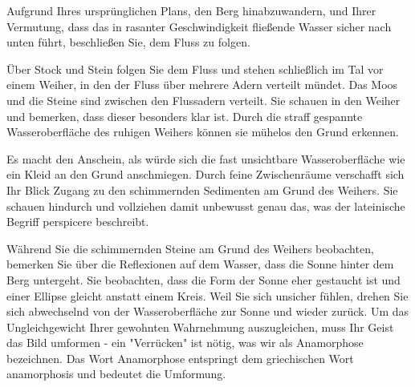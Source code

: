 Aufgrund Ihres ursprünglichen Plans, den Berg hinabzuwandern, und Ihrer Vermutung, dass das in rasanter Geschwindigkeit fließende Wasser sicher nach unten führt, beschließen Sie, dem Fluss zu folgen.

Über Stock und Stein folgen Sie dem Fluss und stehen schließlich im Tal vor einem Weiher, in den der Fluss über mehrere Adern verteilt mündet. Das Moos und die Steine sind zwischen den Flussadern verteilt. Sie schauen in den Weiher und bemerken, dass dieser besonders klar ist. Durch die straff gespannte Wasseroberfläche des ruhigen Weihers können sie mühelos den Grund erkennen. 

Es macht den Anschein, als würde sich die fast unsichtbare Wasseroberfläche wie ein Kleid an den Grund anschmiegen. Durch feine Zwischenräume verschafft sich Ihr Blick Zugang zu den schimmernden Sedimenten am Grund des Weihers. Sie schauen hindurch und vollziehen damit unbewusst genau das, was der lateinische Begriff perspicere beschreibt.

Während Sie die schimmernden Steine am Grund des Weihers beobachten, bemerken Sie über die Reflexionen auf dem Wasser, dass die Sonne hinter dem Berg untergeht. Sie beobachten, dass die Form der Sonne eher gestaucht ist und einer Ellipse gleicht anstatt einem Kreis. Weil Sie sich unsicher fühlen, drehen Sie sich abwechselnd von der Wasseroberfläche zur Sonne und wieder zurück. Um das Ungleichgewicht Ihrer gewohnten Wahrnehmung auszugleichen, muss Ihr Geist das Bild umformen - ein "Verrücken" ist nötig, was wir als Anamorphose bezeichnen. Das Wort Anamorphose entspringt dem griechischen Wort anamorphosis und bedeutet die Umformung.